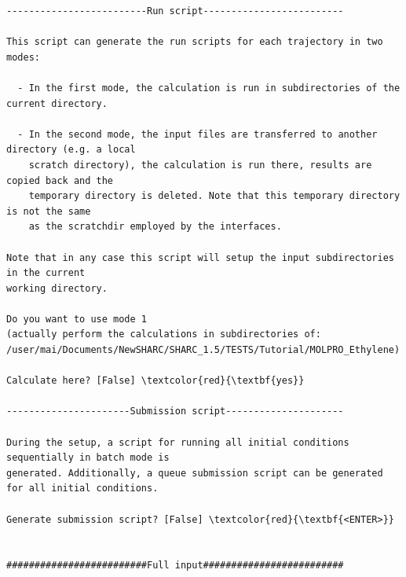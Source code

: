 \documentclass[a4paper,11pt,DIV=15,openany]{scrbook}
\begin{document}
\begin{oframed}
\begin{Verbatim}[commandchars=\\\{\}]
-------------------------Run script-------------------------

This script can generate the run scripts for each trajectory in two modes:

  - In the first mode, the calculation is run in subdirectories of the current directory.

  - In the second mode, the input files are transferred to another directory (e.g. a local 
    scratch directory), the calculation is run there, results are copied back and the 
    temporary directory is deleted. Note that this temporary directory is not the same 
    as the scratchdir employed by the interfaces.

Note that in any case this script will setup the input subdirectories in the current 
working directory. 

Do you want to use mode 1 
(actually perform the calculations in subdirectories of: 
/user/mai/Documents/NewSHARC/SHARC_1.5/TESTS/Tutorial/MOLPRO_Ethylene)

Calculate here? [False] \textcolor{red}{\textbf{yes}}

----------------------Submission script---------------------

During the setup, a script for running all initial conditions sequentially in batch mode is 
generated. Additionally, a queue submission script can be generated for all initial conditions.

Generate submission script? [False] \textcolor{red}{\textbf{<ENTER>}}


#########################Full input#########################


\end{Verbatim}
\end{oframed}
\end{document}
